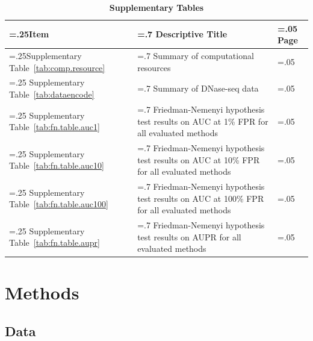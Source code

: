 \documentclass[11pt]{article}
\begin{document}
\begin{table}[h!]
\small
\begin{flushleft}
\caption*{\textbf{{\small Supplementary Tables}}}
\vspace{-0.4cm}
\end{flushleft}
\begin{center}
\renewcommand{\arraystretch}{1.2}
\begin{tabularx}{\textwidth}{ |>{\hsize=.25\hsize}X|>{\hsize=.7\hsize}X|>{\hsize=.05\hsize}X| }
\hline
\textbf{Item} & \textbf{Descriptive Title} & \textbf{Page} \\
\hline
Supplementary Table~\ref{tab:comp.resource} & Summary of computational resources & \pageref{tab:comp.resource} \\
\hline
Supplementary Table~\ref{tab:dataencode} & Summary of DNase-seq data & \pageref{tab:dataencode} \\
\hline
Supplementary Table~\ref{tab:fn.table.auc1} & Friedman-Nemenyi hypothesis test results on AUC at 1\% FPR for all evaluated methods & \pageref{tab:fn.table.auc1} \\
\hline
Supplementary Table~\ref{tab:fn.table.auc10} & Friedman-Nemenyi hypothesis test results on AUC at 10\% FPR for all evaluated methods & \pageref{tab:fn.table.auc10} \\
\hline
Supplementary Table~\ref{tab:fn.table.auc100} & Friedman-Nemenyi hypothesis test results on AUC at 100\% FPR for all evaluated methods & \pageref{tab:fn.table.auc100} \\
\hline
Supplementary Table~\ref{tab:fn.table.aupr} & Friedman-Nemenyi hypothesis test results on AUPR for all evaluated methods & \pageref{tab:fn.table.aupr} \\
\hline
\end{tabularx}
\end{center}
\end{table}

\clearpage

\section{Methods}
\label{sec:methods}

\subsection{Data}
\label{sec:data}
\end{document}
